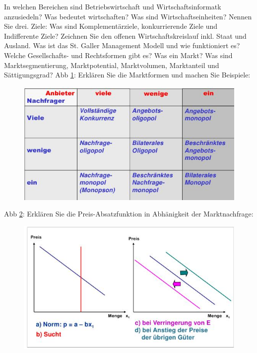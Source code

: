 \documentclass[ngerman,a4paper,12pt]{scrreprt}
\begin{document}
\olR
	\li In welchen Bereichen sind Betriebswirtschaft und Wirtschaftsinformatk anzusiedeln? Was bedeutet wirtschaften?
	\li Was sind Wirtschaftseinheiten? Nennen Sie drei.
	\li Ziele: Was sind Komplementärziele, konkurrierende Ziele und Indifferente Ziele?
	\li Zeichnen Sie den offenen Wirtschaftskreislauf inkl. Staat und Ausland.
	\li Was ist das St. Galler Management Modell und wie funktioniert es?
	\li Welche Gesellschafts- und Rechtsformen gibt es?
	\li Was ein Markt? Was sind Marktsegmentierung, Marktpotential, Marktvolumen, Marktanteil und Sättigungsgrad?
	\li Abb \ref{marktformen}: Erklären Sie die Marktformen und machen Sie Beispiele:
 	\begin{figure}[htp]
		\centering
		\includegraphics[scale=0.60]{img/R3.1.jpg}
		\caption{}
		\label{marktformen}
	\end{figure}
	\li Abb \ref{preisabsatzfunktion}: Erklären Sie die Preis-Absatzfunktion in Abhänigkeit der Marktnachfrage:
 	\begin{figure}[htp]
		\centering
		\includegraphics[scale=0.60]{img/R3.2.jpg}
		\caption{}
		\label{preisabsatzfunktion}
	\end{figure}
\end{document}
